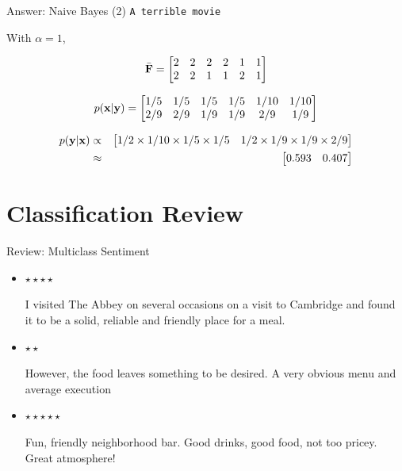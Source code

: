 \documentclass{beamer}
\begin{document}
\begin{frame}{Answer: Naive Bayes (2) }
  \texttt{A terrible movie}
  \air

  With $\alpha = 1$,

  \[ \bar{\mathbf{F}} =
    \begin{bmatrix}
      2 & 2 & 2 & 2 & 1 & 1 \\
      2 & 2 & 1 & 1 & 2 & 1 \\
    \end{bmatrix}
  \]

  \[ p(\mathbf{x} | \mathbf{y}) =     \begin{bmatrix}
      1/5 & 1/5 & 1/5 & 1/5 & 1/10 & 1/10 \\
      2/9 & 2/9 & 1/9 & 1/9 & 2/9 & 1/9 \\
    \end{bmatrix}
  \]

  \begin{eqnarray*}
    p(\mathbf{y} | \mathbf{x}) &\propto& \begin{bmatrix} 1/2 \times 1/10 \times 1/5 \times 1/5 &  1/2 \times 1/9 \times 1/9 \times 2/9  \end{bmatrix} \\
    &\approx&     \begin{bmatrix} 0.593 & 0.407 \end{bmatrix}
  \end{eqnarray*}



\end{frame}
\section{Classification Review}

\begin{frame}{Review: Multiclass Sentiment}
    \begin{itemize}
    \item
      $\star \star \star \star$

      I visited The Abbey on several occasions on a visit to Cambridge and found it to be a solid, reliable and friendly place for a meal.

    \item $\star \star$

      However, the food leaves something to be desired. A very obvious menu and average execution

    \item $\star \star \star \star \star$

      Fun, friendly neighborhood bar. Good drinks, good food, not too pricey. Great atmosphere!
  \end{itemize}
\end{frame}
\end{document}
